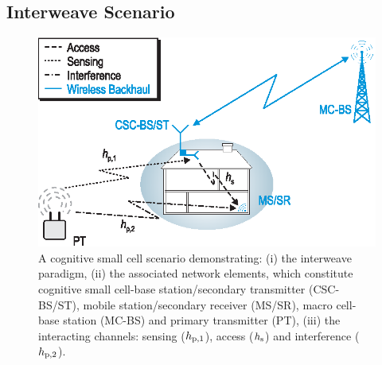 \subsection{Interweave Scenario}
\begin{figure}[!ht]
\centering
\includegraphics[width = \figscale]{figures/CR_Scenario_Interweave}
\caption{A cognitive small cell scenario demonstrating: (i) the interweave paradigm, (ii) the associated network elements, which constitute cognitive small cell-base station/secondary transmitter (CSC-BS/ST), mobile station/secondary receiver (MS/SR), macro cell-base station (MC-BS) and primary transmitter (PT), (iii) the interacting channels: sensing ($h_{\text{p,1}}$), access ($h_{\text{s}}$) and interference ($h_{\text{p,2}}$).} 
\label{fig_IS:scenario}
\end{figure}
